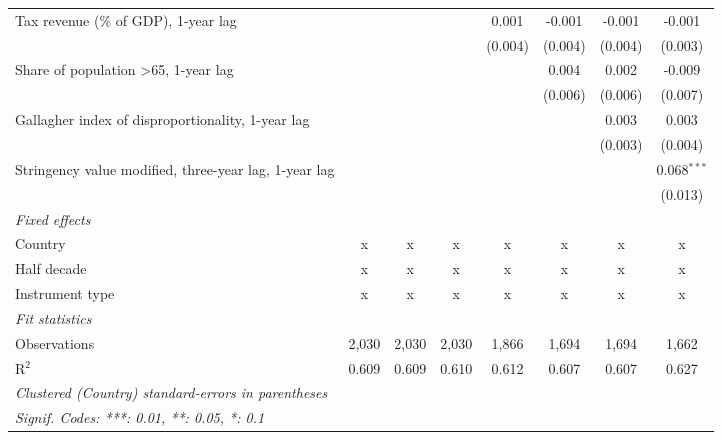 \begin{tabular}{lccccccc}
   Tax revenue (\% of GDP), 1-year lag                                  &         &         &         & 0.001   & -0.001        & -0.001        & -0.001\\   
                                                                        &         &         &         & (0.004) & (0.004)       & (0.004)       & (0.003)\\   
   Share of population >65, 1-year lag                                  &         &         &         &         & 0.004         & 0.002         & -0.009\\   
                                                                        &         &         &         &         & (0.006)       & (0.006)       & (0.007)\\   
   Gallagher index of disproportionality, 1-year lag                    &         &         &         &         &               & 0.003         & 0.003\\   
                                                                        &         &         &         &         &               & (0.003)       & (0.004)\\   
   Stringency value modified, three-year lag, 1-year lag                &         &         &         &         &               &               & 0.068$^{***}$\\   
                                                                        &         &         &         &         &               &               & (0.013)\\   
   \emph{Fixed effects}\\
   Country                                                              & x       & x       & x       & x       & x             & x             & x\\  
   Half decade                                                          & x       & x       & x       & x       & x             & x             & x\\  
   Instrument type                                                      & x       & x       & x       & x       & x             & x             & x\\  
   \midrule \emph{Fit statistics}\\
   Observations                                                         & 2,030   & 2,030   & 2,030   & 1,866   & 1,694         & 1,694         & 1,662\\  
   R$^2$                                                                & 0.609   & 0.609   & 0.610   & 0.612   & 0.607         & 0.607         & 0.627\\  
   \midrule
   \multicolumn{8}{l}{\emph{Clustered (Country) standard-errors in parentheses}}\\
   \multicolumn{8}{l}{\emph{Signif. Codes: ***: 0.01, **: 0.05, *: 0.1}}\\
\end{tabular}
\par\endgroup


